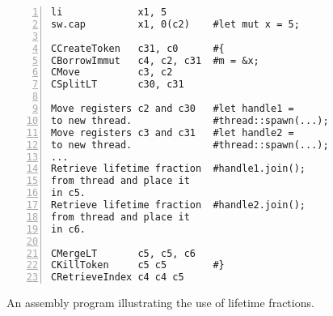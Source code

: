 \begin{figure}[h]
\begin{lstlisting}[style=custASM, numbers = left ,xleftmargin=1.5em]
li             x1, 5
sw.cap         x1, 0(c2)    #let mut x = 5;

CCreateToken   c31, c0      #{
CBorrowImmut   c4, c2, c31  #m = &x;
CMove          c3, c2
CSplitLT       c30, c31

Move registers c2 and c30   #let handle1 =
to new thread.              #thread::spawn(...);
Move registers c3 and c31   #let handle2 =
to new thread.              #thread::spawn(...);
...
Retrieve lifetime fraction  #handle1.join();
from thread and place it
in c5.
Retrieve lifetime fraction  #handle2.join();
from thread and place it
in c6.

CMergeLT       c5, c5, c6
CKillToken     c5 c5        #}
CRetrieveIndex c4 c4 c5
\end{lstlisting}
\caption{An assembly program illustrating the use of lifetime fractions.}
\label{fig:asmthreadexample}
\end{figure}
